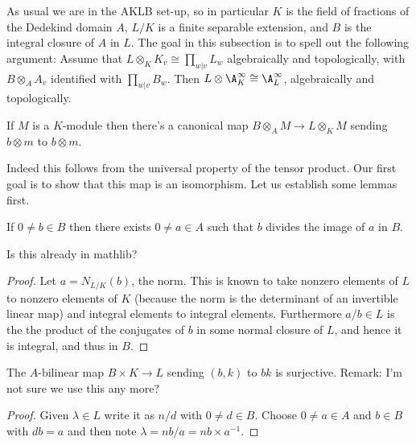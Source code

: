 As usual we are
in the AKLB set-up, so in particular $K$ is the field
of fractions of the Dedekind domain $A$, $L/K$ is a finite
separable extension, and $B$ is the integral closure of $A$
in $L$. The goal in this subsection is to spell out the following argument: Assume that
$L\otimes_KK_v\cong\prod_{w|v}L_w$
algebraically and topologically, with $B\otimes_AA_v$ identified with $\prod_{w|v}B_w$.
Then $L\otimes\A_K^\infty\cong\A_L^\infty$, algebraically and topologically.

\begin{definition}
  \label{TODOneedslabel3}
  If $M$ is a $K$-module then there's a canonical
  map $B\otimes_AM\to L\otimes_KM$ sending $b\otimes m$ to $b\otimes m$.
\end{definition}

Indeed this follows from the universal property of the tensor product. Our first goal
is to show that this map is an isomorphism. Let us establish some lemmas first.

\begin{lemma}
  \label{TODOtemplabel1}
  If $0\not=b\in B$ then there exists $0\not=a\in A$ such that $b$ divides
  the image of $a$ in $B$.
\end{lemma}
\begin{remark} Is this already in mathlib?
\end{remark}
\begin{proof} Let $a=N_{L/K}(b)$, the norm. This is known to take nonzero elements of $L$
to nonzero elements of $K$ (because the norm is the determinant of an invertible linear map)
and integral elements to integral elements. Furthermore $a/b\in L$ is the the product of the
conjugates of $b$ in some normal closure of $L$, and hence it is integral, and thus in $B$.
\end{proof}

\begin{corollary}
  \label{TODOtemplabel2}
  The $A$-bilinear map $B\times K\to L$ sending $(b,k)$ to $bk$ is surjective.
  Remark: I'm not sure we use this any more?
\end{corollary}
\begin{proof} Given $\lambda\in L$ write it as $n/d$ with $0\not=d\in B$. Choose $0\not=a\in A$
  and $b\in B$ with $db=a$ and then note $\lambda=nb/a=nb\times a^{-1}$.
\end{proof}

